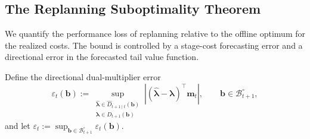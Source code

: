 \documentclass{uai2026} %
\newcommand{\1}{\mathbf{1}}
\renewcommand{\epsilon}{\varepsilon}
\newcommand{\bcal}{\mathcal{B}}
\begin{document}
\subsection{The Replanning Suboptimality Theorem}

We quantify the performance loss of replanning relative to the offline optimum for the realized costs.
The bound is controlled by a stage-cost forecasting error and a directional error in the forecasted tail value function.

Define the directional dual-multiplier error
\begin{equation}
  \label{eq:eps-def-app}
  \epsilon_t(\mathbf{b})
  :=
  \sup_{\substack{\hat{\boldsymbol{\lambda}}\in\hat{D}_{t+1\mid t}(\mathbf{b})\\ \boldsymbol{\lambda}\in D_{t+1}(\mathbf{b})}}
  \left| (\hat{\boldsymbol{\lambda}}-\boldsymbol{\lambda})^\top\mathbf{m}_t \right|,
  \qquad \mathbf{b}\in\bcal_{t+1}^{\circ},
\end{equation}
and let $\epsilon_t := \sup_{\mathbf{b}\in\bcal_{t+1}^{\circ}} \epsilon_t(\mathbf{b})$.
\end{document}

